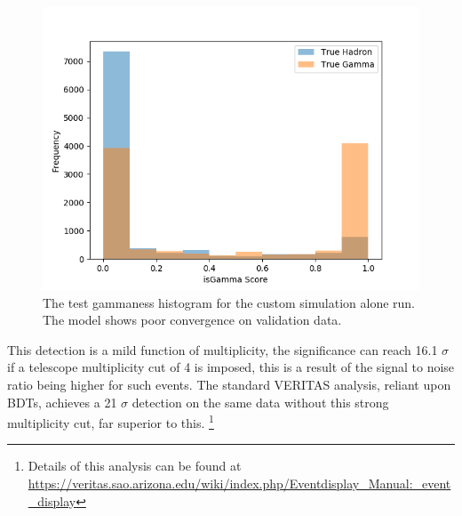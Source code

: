 \begin{figure}[] 
        \centering \includegraphics[width=\columnwidth]{figures/crabrun2_hist.png}

        \caption{
                \label{fig:cr2_hist} The test gammaness histogram for the custom simulation alone run. The model shows poor convergence on validation data.
        }
\end{figure}
\begin{table}[h]
    \centering
    \caption{Anasum output for the opt4 run, without applying a strenuous multiplicity cut.}
    \label{table:opt4}
\end{table}

This detection is a mild function of multiplicity, the significance can reach 16.1 $\sigma$ if a telescope multiplicity cut of 4 is imposed, this is a result of the signal to noise ratio being higher for such events. The standard VERITAS analysis, reliant upon BDTs, achieves a 21 $\sigma$ detection on the same data without this strong multiplicity cut, far superior to this. \footnote{Details of this analysis can be found at \url{https://veritas.sao.arizona.edu/wiki/index.php/Eventdisplay_Manual:_event_display}}

